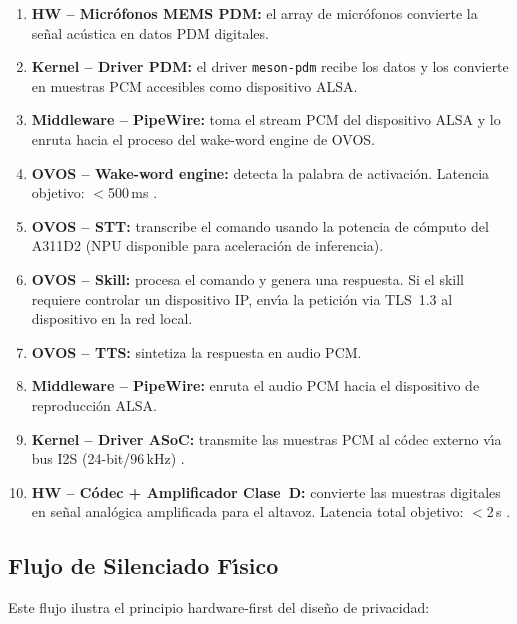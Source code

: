 \begin{enumerate}
  \item \textbf{HW -- Micr\'{o}fonos MEMS PDM:} el array de micr\'{o}fonos
    convierte la se\~{n}al ac\'{u}stica en datos PDM digitales.
  \item \textbf{Kernel -- Driver PDM:} el driver \texttt{meson-pdm} recibe
    los datos y los convierte en muestras PCM accesibles como dispositivo ALSA.
  \item \textbf{Middleware -- PipeWire:} toma el stream PCM del dispositivo ALSA
    y lo enruta hacia el proceso del wake-word engine de OVOS.
  \item \textbf{OVOS -- Wake-word engine:} detecta la palabra de activaci\'{o}n.
    Latencia objetivo: $<$500\,ms .
  \item \textbf{OVOS -- STT:} transcribe el comando usando la potencia de c\'{o}mputo
    del A311D2 (NPU disponible para aceleraci\'{o}n de inferencia).
  \item \textbf{OVOS -- Skill:} procesa el comando y genera una respuesta. Si
    el skill requiere controlar un dispositivo IP, env\'{\i}a la petici\'{o}n
    via TLS~1.3 al dispositivo en la red local.
  \item \textbf{OVOS -- TTS:} sintetiza la respuesta en audio PCM.
  \item \textbf{Middleware -- PipeWire:} enruta el audio PCM hacia el dispositivo
    de reproducci\'{o}n ALSA.
  \item \textbf{Kernel -- Driver ASoC:} transmite las muestras PCM al c\'{o}dec
    externo v\'{\i}a bus I2S (24-bit/96\,kHz) .
  \item \textbf{HW -- C\'{o}dec + Amplificador Clase~D:} convierte las muestras
    digitales en se\~{n}al anal\'{o}gica amplificada para el altavoz.
    Latencia total objetivo: $<$2\,s .
\end{enumerate}

\subsection{Flujo de Silenciado F\'{\i}sico}

Este flujo ilustra el principio hardware-first del dise\~{n}o de privacidad:

